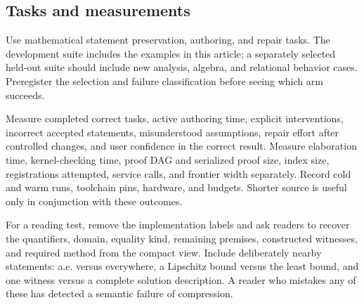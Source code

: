 \documentclass[11pt,a4paper]{article}
\theoremstyle{definition}
\theoremstyle{remark}
\begin{document}
\subsection{Tasks and measurements}
Use mathematical statement preservation, authoring, and repair tasks.
The development suite includes the examples in this article; a separately
selected held-out suite should include new analysis, algebra, and relational
behavior cases. Preregister the selection and failure classification before
seeing which arm succeeds.

Measure completed correct tasks, active authoring time, explicit interventions,
incorrect accepted statements, misunderstood assumptions, repair effort after
controlled changes, and user confidence in the correct result. Measure
elaboration time, kernel-checking time, proof DAG and serialized proof size,
index size, registrations attempted, service calls, and frontier width
separately. Record cold and warm runs, toolchain pins, hardware, and budgets.
Shorter source is useful only in conjunction with these outcomes.

For a reading test, remove the implementation labels and ask readers to recover
the quantifiers, domain, equality kind, remaining premises, constructed
witnesses, and required method from the compact view. Include deliberately
nearby statements: a.e. versus everywhere, a Lipschitz bound versus the least
bound, and one witness versus a complete solution description. A reader who
mistakes any of these has detected a semantic failure of compression.
\end{document}
